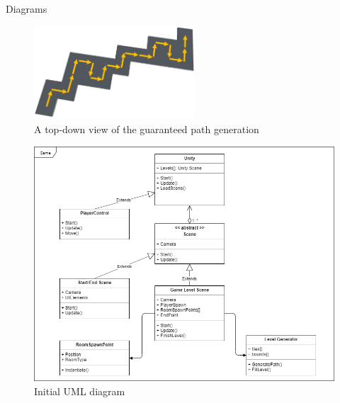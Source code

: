 \documentclass[progress]{cmpreport}
\begin{document}
\begin{section}{Diagrams}

\begin{figure}
    \includegraphics[width=6cm]{img/1-maze.png}
    \caption{A top-down view of the guaranteed path generation}
    \label{fig:pathgen}
\end{figure}

\begin{figure}
    \includegraphics[width=\textwidth]{img/uml1.png}
    \caption{Initial UML diagram}
    \label{fig:uml1}
\end{figure}

\end{section}
\end{document}
